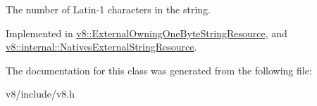 The number of Latin-\/1 characters in the string. 

Implemented in \mbox{\hyperlink{classv8_1_1ExternalOwningOneByteStringResource_a162cec5c2469a2acf26efe384ceffe32}{v8\+::\+External\+Owning\+One\+Byte\+String\+Resource}}, and \mbox{\hyperlink{classv8_1_1internal_1_1NativesExternalStringResource_aea52fbf749b2a249d23ce74caa8db7f1}{v8\+::internal\+::\+Natives\+External\+String\+Resource}}.



The documentation for this class was generated from the following file\+:\begin{DoxyCompactItemize}
\item 
v8/include/v8.\+h\end{DoxyCompactItemize}
